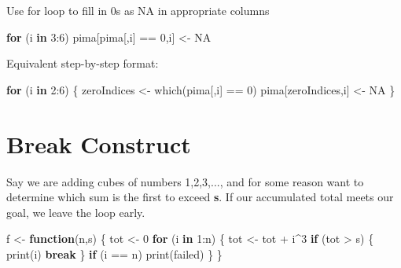 \documentclass[
]{article}
\newenvironment{Shaded}{\begin{snugshade}}{\end{snugshade}}
\newcommand{\ConstantTok}[1]{\textcolor[rgb]{0.00,0.00,0.00}{#1}}
\newcommand{\ControlFlowTok}[1]{\textcolor[rgb]{0.13,0.29,0.53}{\textbf{#1}}}
\newcommand{\DecValTok}[1]{\textcolor[rgb]{0.00,0.00,0.81}{#1}}
\newcommand{\FunctionTok}[1]{\textcolor[rgb]{0.00,0.00,0.00}{#1}}
\newcommand{\NormalTok}[1]{#1}
\newcommand{\OtherTok}[1]{\textcolor[rgb]{0.56,0.35,0.01}{#1}}
\newcommand{\SpecialCharTok}[1]{\textcolor[rgb]{0.00,0.00,0.00}{#1}}
\newcommand{\StringTok}[1]{\textcolor[rgb]{0.31,0.60,0.02}{#1}}
\begin{document}
Use for loop to fill in 0s as NA in appropriate columns

\begin{Shaded}
\begin{Highlighting}[]
\ControlFlowTok{for}\NormalTok{ (i }\ControlFlowTok{in} \DecValTok{3}\SpecialCharTok{:}\DecValTok{6}\NormalTok{) pima[pima[,i] }\SpecialCharTok{==} \DecValTok{0}\NormalTok{,i] }\OtherTok{\textless{}{-}} \ConstantTok{NA}
\end{Highlighting}
\end{Shaded}

Equivalent step-by-step format:

\begin{Shaded}
\begin{Highlighting}[]
\ControlFlowTok{for}\NormalTok{ (i }\ControlFlowTok{in} \DecValTok{2}\SpecialCharTok{:}\DecValTok{6}\NormalTok{) \{}
\NormalTok{   zeroIndices }\OtherTok{\textless{}{-}} \FunctionTok{which}\NormalTok{(pima[,i] }\SpecialCharTok{==} \DecValTok{0}\NormalTok{)}
\NormalTok{   pima[zeroIndices,i] }\OtherTok{\textless{}{-}} \ConstantTok{NA}
\NormalTok{\}}
\end{Highlighting}
\end{Shaded}

\hypertarget{break-construct}{%
\section{Break Construct}\label{break-construct}}

Say we are adding cubes of numbers 1,2,3,..., and for some reason want
to determine which sum is the first to exceed \textbf{s}. If our
accumulated total meets our goal, we leave the loop early.

\begin{Shaded}
\begin{Highlighting}[]
\NormalTok{f }\OtherTok{\textless{}{-}} \ControlFlowTok{function}\NormalTok{(n,s) \{}
\NormalTok{   tot }\OtherTok{\textless{}{-}} \DecValTok{0}
   \ControlFlowTok{for}\NormalTok{ (i }\ControlFlowTok{in} \DecValTok{1}\SpecialCharTok{:}\NormalTok{n) \{}
\NormalTok{      tot }\OtherTok{\textless{}{-}}\NormalTok{ tot }\SpecialCharTok{+}\NormalTok{ i}\SpecialCharTok{\^{}}\DecValTok{3}
      \ControlFlowTok{if}\NormalTok{ (tot }\SpecialCharTok{\textgreater{}}\NormalTok{ s) \{}
         \FunctionTok{print}\NormalTok{(i)}
         \ControlFlowTok{break}
\NormalTok{      \}}
      \ControlFlowTok{if}\NormalTok{ (i }\SpecialCharTok{==}\NormalTok{ n) }\FunctionTok{print}\NormalTok{(}\StringTok{\textquotesingle{}failed\textquotesingle{}}\NormalTok{)}
\NormalTok{   \}}
\NormalTok{\}}
\end{Highlighting}
\end{Shaded}
\end{document}
